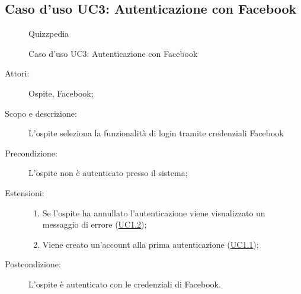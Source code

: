 \subsection{Caso d'uso UC3: Autenticazione con Facebook}
        \begin{figure}[H]
            \centering
            \begin{resizedtikzpicture}{\textwidth}
		\begin{umlsystem}[x=0, fill=lightgray!20]{Quizzpedia}
		\end{umlsystem}
            \end{resizedtikzpicture}
            \caption{Caso d'uso UC3: Autenticazione con Facebook}
            \label{fig:UC3} 
        \end{figure}
    \begin{description}
\item[Attori:] Ospite, Facebook;
\item[Scopo e descrizione:] L'ospite seleziona la funzionalità di login tramite credenziali Facebook
      \item[Precondizione:] L'ospite non è autenticato presso il sistema;
    \item[Estensioni:]
      \begin{enumerate}
          \item Se l'ospite ha annullato l'autenticazione viene visualizzato un messaggio di errore (\hyperlink{UC1.2}{UC1.2});
          \item Viene creato un'account alla prima autenticazione	 (\hyperlink{UC1.1}{UC1.1});

      \end{enumerate}
    \item[Postcondizione:] L'ospite è autenticato con le credenziali di Facebook.
  \end{description}
\hypertarget{UC4}{}
